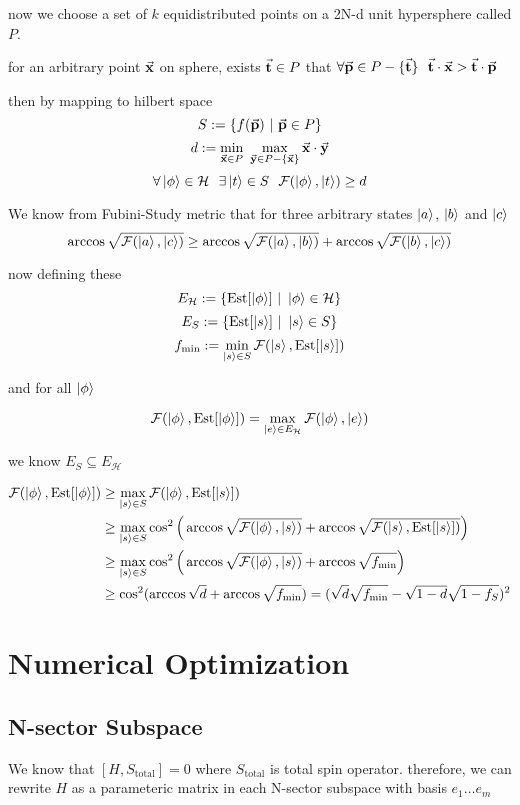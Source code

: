 \documentclass{article}
\DeclareMathOperator*{\est}{Est}
\begin{document}
now we choose a set of $k$ equidistributed points on a 2N-d unit hypersphere called $P$.

for an arbitrary point $\va{x}$ on sphere, exists $\va{t} \in P$ that $\forall \va{p} \in P - \{\va{t}\} ~~ \va{t}\cdot\va{x} > \va{t}\cdot \va{p}$

then by mapping to hilbert space
\[ S := \{ f(\va{p}) ~|~ \va{p} \in P \} \]
\[ d := \min_{\va{x} \in P} ~\max_{\va{y} \in P - \{\va{x}\}} \va{x}\cdot\va{y} \]
\[ \forall \ket{\phi} \in \mathcal{H} ~~ \exists \ket{t} \in S ~~ \mathcal{F}(\ket{\phi}, \ket{t}) \ge d \]

We know from Fubini-Study metric that for three arbitrary states $\ket{a}$, $\ket{b}$ and $\ket{c}$
\[ \arccos\sqrt{\mathcal{F}(\ket{a},\ket{c})} \ge \arccos\sqrt{\mathcal{F}(\ket{a},\ket{b})} + \arccos\sqrt{\mathcal{F}(\ket{b},\ket{c})}  \]

now defining these
\[ E_{\mathcal{H}} := \{\est[\ket{\phi}] ~|~ \ket{\phi} \in \mathcal{H} \} \]
\[ E_S := \{\est[\ket{s}] ~|~ \ket{s} \in S \} \]
\[ f_{\min} := \min_{\ket{s} \in S} \mathcal{F}(\ket{s}, \est[\ket{s}]) \] 

and for all $\ket{\phi}$

\[ \mathcal{F}(\ket{\phi}, \est[\ket{\phi}]) = \max_{\ket{e} \in E_{\mathcal{H}}} \mathcal{F}(\ket{\phi}, \ket{e})\]

we know $E_S \subseteq E_{\mathcal{H}}$

\begin{align*} \mathcal{F}(\ket{\phi}, \est[\ket{\phi}]) &\ge \max_{\ket{s} \in S} \mathcal{F}(\ket{\phi}, \est[\ket{s}]) \\ &\ge \max_{\ket{s} \in S} \cos^2\Big( \arccos\sqrt{\mathcal{F} (\ket{\phi}, \ket{s})} + \arccos\sqrt{\mathcal{F}(\ket{s}, \est[\ket{s}])} \Big) 
\\ &\ge \max_{\ket{s} \in S} \cos^2\Big(\arccos\sqrt{\mathcal{F} (\ket{\phi}, \ket{s})} + \arccos{\sqrt{f_{\min}}}\Big)  
\\ &\ge \cos^2(\arccos\sqrt{d} + \arccos\sqrt{f_{\min}}) = (\sqrt{d}\sqrt{f_{\min}} - \sqrt{1-d}\sqrt{1-f_S})^2
\end{align*}

\section{Numerical Optimization}
\subsection{N-sector Subspace}
We know that $[H, S_{\text{total}}] = 0$ where $S_{\text{total}}$ is total spin operator. therefore, we can rewrite $H$ as a parameteric matrix in each N-sector subspace with basis $e_1 \dots e_m$
\end{document}
